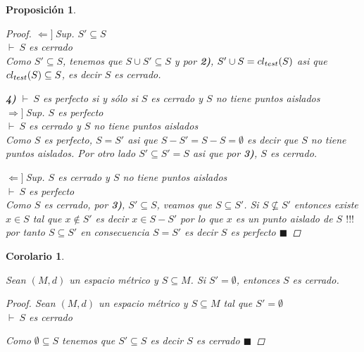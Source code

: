 \documentclass[oneside]{book} %
\theoremstyle{Teorema}
\newtheorem{Corolario}[Definicion]{Corolario}
\newtheorem{Proposicion}[Definicion]{Proposición}
\theoremstyle{Ejemplos}
\theoremstyle{[Obs]}
\def \test {test}
\newcommand{\cerradura}[2][\test]{\ifx \test #1 {\overline{#2}} \else {cl_{#1}(#2)} \fi} %
\renewcommand{\{}{\left\lbrace} %
\renewcommand{\}}{\right\rbrace} %
\renewcommand{\u}{\cup} %
\renewcommand{\sc}{\subseteq} %
\renewcommand{\qed}{$\blacksquare$} %
\newcommand{\pd}{$\vdash\ $} %
\renewcommand{\c}{$!!!\ $} %
\newcommand{\necesidad}{$\Rightarrow]\ $} %
\newcommand{\suficiencia}{$\Leftarrow]\ $} %
\begin{document}
\begin{Proposicion}
\begin{proof}
					\suficiencia Sup. $S' \sc S$ \\ 
					\pd $S$ es cerrado \\ 
					Como $S' \sc S$, tenemos que $S \u S' \sc S$ y por \textbf{2)}, $S' \u S = \cerradura{S}$ asi que $\cerradura{S} \sc S$, es decir $S$ es cerrado.

					\textbf{4)} \pd $S$ es perfecto si y sólo si $S$ es cerrado y $S$ no tiene puntos aislados \\
					\necesidad Sup. $S$ es perfecto \\ 
					\pd $S$ es cerrado y $S$ no tiene puntos aislados \\ 
					Como $S$ es perfecto, $S = S'$ asi que $S - S' = S - S = \emptyset$ es decir que $S$ no tiene puntos aislados. Por otro lado $S' \sc S' = S$ asi que por \textbf{3)}, $S$ es cerrado.

					\suficiencia Sup. $S$ es cerrado y $S$ no tiene puntos aislados \\ 
					\pd $S$ es perfecto \\ 
					Como $S$ es cerrado, por \textbf{3)}, $S' \sc S$, veamos que $S \sc S'$. Si $S \nsubseteq S'$ entonces existe $x \in S$ tal que $x \notin S'$ es decir $x \in S - S'$ por lo que $x$ es un punto aislado de $S$ \c por tanto $S \sc S'$ en consecuencia $S = S'$ es decir $S$ es perfecto \qed

				\end{proof}
			
			\end{Proposicion}

			\begin{Corolario}\label{Corolario: Todo conjunto sin puntos de acumulacion es cerrado}\setlength{\parindent}{0em}
				
				Sean $(M, d)$ un espacio métrico y $S \sc M$. Si $S' = \emptyset$, entonces $S$ es cerrado.

				\begin{proof}
					
					Sean $(M, d)$ un espacio métrico y $S \sc M$ tal que $S' = \emptyset$ \\ 
					\pd $S$ es cerrado 

					Como $\emptyset \sc S$ tenemos que $S' \sc S$ es decir $S$ es cerrado \qed

				\end{proof}

			\end{Corolario}
\end{document}
